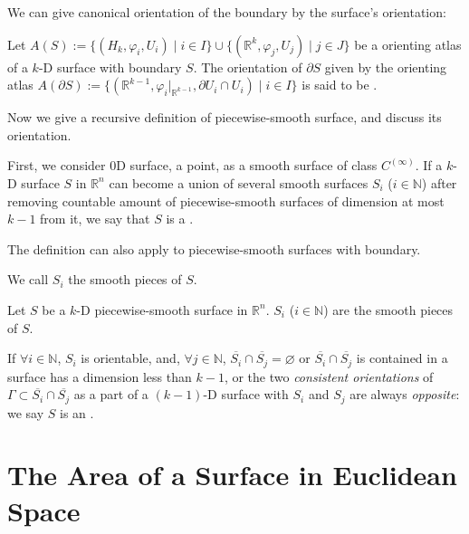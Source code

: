 \documentclass[openany]{book}
\begin{document}
We can give canonical orientation of the boundary by the surface's orientation:

\begin{definition}
	Let $A(S) := \{(H_k, \varphi_i, U_i) \mid i \in I\} \cup \{(\mathbb R^k, \varphi_j, U_j) \mid j \in J\}$ be a orienting atlas of a $k$-D surface with boundary $S$. 
	The orientation of $\partial S$ given by the orienting atlas $A(\partial S) := \{(\mathbb R^{k-1}, \varphi_i|_{\mathbb R^{k-1}}, \partial U_i \cap U_i) \mid i \in I\}$ is said to be .
\end{definition}

Now we give a recursive definition of piecewise-smooth surface, and discuss its orientation.

\begin{definition}
	First, we consider 0D surface, a point, as a smooth surface of class $C^{(\infty)}$. 
	If a $k$-D surface $S$ in $\mathbb R^n$ can become a union of several smooth surfaces $S_i$ ($i \in \mathbb N$) after removing countable amount of piecewise-smooth surfaces of dimension at most $k-1$ from it, we say that $S$ is a .
\end{definition}

The definition can also apply to piecewise-smooth surfaces with boundary.

We call $S_i$ the smooth pieces of $S$.

\begin{definition}
	Let $S$ be a $k$-D piecewise-smooth surface in $\mathbb R^n$. 
	$S_i$ ($i \in \mathbb N$) are the smooth pieces of $S$.

	If $\forall i \in \mathbb N$, $S_i$ is orientable, and, $\forall j \in \mathbb N$, $\overline{S_i} \cap \overline{S_j} = \varnothing$ or $\overline{S_i} \cap \overline{S_j}$ is contained in a surface has a dimension less than $k - 1$, or the two \emph{consistent orientations} of $\varGamma \subset \overline{S_i} \cap \overline{S_j}$ as a part of a $(k-1)$-D surface with $S_i$ and $S_j$ are always \emph{opposite}:
	we say $S$ is an .
\end{definition}

\section{The Area of a Surface in Euclidean Space}
\end{document}
